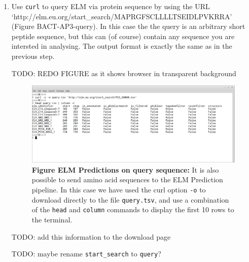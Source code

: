 \begin{enumerate}
\item Use \texttt{curl} to query ELM via protein sequence by using the URL
	`http://elm.eu.org/start\_search/MAPRGFSCLLLLTSEIDLPVKRRA' (Figure
	BACT-AP3-query). In this case the the query is an arbitrary short
	peptide sequence, but this can (of course) contain any sequence you are
	intersted in analysing. The output format is exactly the same as in the
	previous step.


TODO: REDO FIGURE as it shows browser in transparent background

\begin{figure}[h!]
	\centering
	\includegraphics[width=\textwidth]{Figures/predicting_REST/predictions_query.png} 
	\caption{
	\textbf{Figure ELM Predictions on query sequence:}
	It is also possible to send amino
	acid sequences to the ELM Prediction pipeline. In this case we have used
	the curl option \texttt{-o} to download directly to the file
	\texttt{query.tsv}, and use a combination of the \texttt{head} and
	\texttt{column} commands to display the first 10 rows to the terminal.
	}
	\label{fig:predicting_REST_query}
\end{figure}

TODO: add this information to the download page

TODO: maybe rename \texttt{start\_search} to \texttt{query}?

\end{enumerate}
